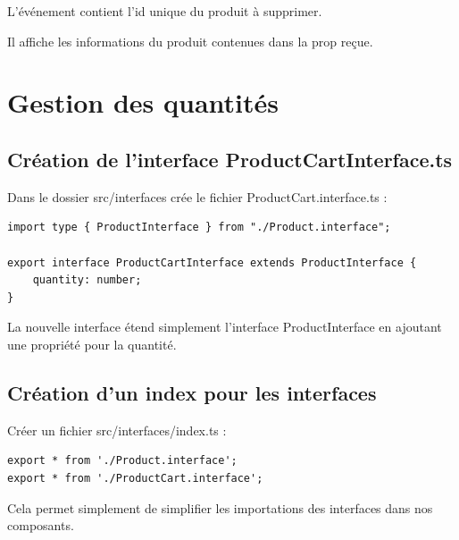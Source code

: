\documentclass{article}
\begin{document}
L'événement contient l'{\color{monOrange}id} unique du produit à supprimer.

Il affiche les informations du produit contenues dans la {\color{monOrange}prop} reçue.



\section{Gestion des quantités}
\subsection{Création de l'interface {\color{monOrange}ProductCartInterface.ts}}
Dans le dossier {\color{monOrange}src/interfaces} crée le fichier {\color{monOrange}ProductCart.interface.ts} :
\begin{verbatim}
import type { ProductInterface } from "./Product.interface";

export interface ProductCartInterface extends ProductInterface {
    quantity: number;
}
\end{verbatim}
La nouvelle interface étend simplement l'interface {\color{monOrange}ProductInterface} en ajoutant une propriété pour la quantité.

\subsection{Création d'un {\color{monOrange}index} pour les interfaces}
Créer un fichier {\color{monOrange}src/interfaces/index.ts} :
\begin{verbatim}
export * from './Product.interface';
export * from './ProductCart.interface';
\end{verbatim}
Cela permet simplement de simplifier les importations des interfaces dans nos composants.
\end{document}
